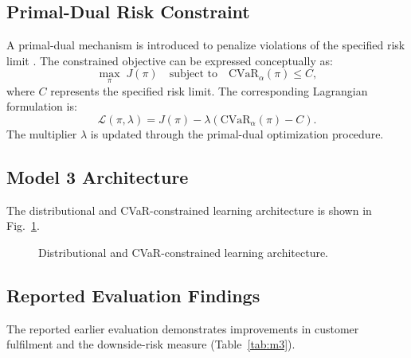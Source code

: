 \documentclass[conference]{IEEEtran}
\begin{document}
\subsection{Primal-Dual Risk Constraint}
A primal-dual mechanism is introduced to penalize violations of the specified risk limit \cite{chow2014cvar}. The constrained objective can be expressed conceptually as:
\begin{equation}
  \max_{\pi}\; J(\pi) \quad \text{subject to} \quad \mathrm{CVaR}_\alpha(\pi) \le C,
\end{equation}
where $C$ represents the specified risk limit. The corresponding Lagrangian formulation is:
\begin{equation}
  \mathcal{L}(\pi,\lambda) = J(\pi) - \lambda\left(\mathrm{CVaR}_\alpha(\pi) - C\right).
\end{equation}
The multiplier $\lambda$ is updated through the primal-dual optimization procedure.

\subsection{Model 3 Architecture}
The distributional and CVaR-constrained learning architecture is shown in Fig.~\ref{fig:m3arch}.

\begin{figure}[!t]
\centering
{}
\caption{Distributional and CVaR-constrained learning architecture.}
\label{fig:m3arch}
\end{figure}

\subsection{Reported Evaluation Findings}
The reported earlier evaluation demonstrates improvements in customer fulfilment and the downside-risk measure (Table~\ref{tab:m3}).
\end{document}
